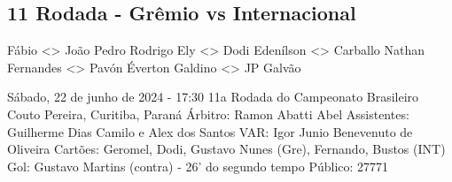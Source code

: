 \newpage
\subsection{11 Rodada - Grêmio vs Internacional}

\begin{figure}[H]
    \centering
    
\end{figure}

Fábio <> João Pedro
Rodrigo Ely <> Dodi
Edenílson <> Carballo
Nathan Fernandes <> Pavón
Éverton Galdino <> JP Galvão

Sábado, 22 de junho de 2024 - 17:30 
11a Rodada do Campeonato Brasileiro
Couto Pereira, Curitiba, Paraná
Árbitro: Ramon Abatti Abel
Assistentes: Guilherme Dias Camilo e Alex dos Santos
VAR: Igor Junio Benevenuto de Oliveira
Cartões: Geromel, Dodi, Gustavo Nunes (Gre), Fernando, Bustos (INT)
Gol: Gustavo Martins (contra) - 26' do segundo tempo
Público: 27771 